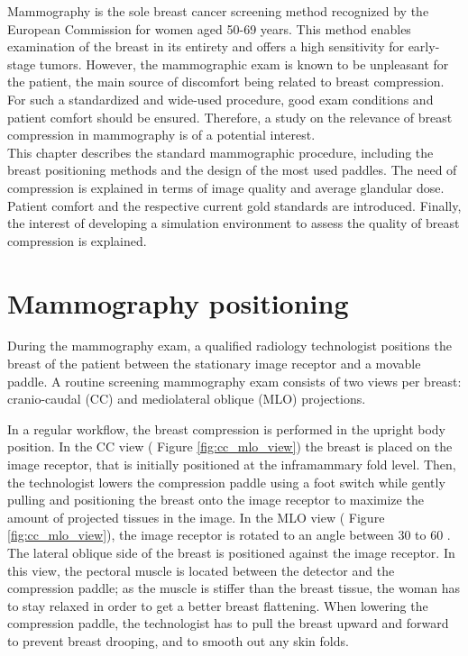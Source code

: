 

Mammography is the sole breast cancer screening method recognized by the European Commission for women aged 50-69 years. This method enables examination of the breast in its entirety and offers a high sensitivity for early-stage tumors. However, the mammographic exam is known to be unpleasant for the patient, the main source of discomfort being related to breast compression.  For such a standardized and wide-used procedure, good exam conditions and patient comfort should be ensured. Therefore, a study on the relevance of breast compression in mammography is of a potential interest.\\



 This chapter describes the standard mammographic procedure, including the breast positioning methods and the design of the most used paddles. The need of compression is explained in terms of image quality and average glandular dose. Patient comfort and the respective current gold standards are introduced. Finally, the interest of developing a simulation environment to assess the quality of breast compression is explained.

\clearpage
\section{Mammography positioning} \label{subsec:mammographicpositioning}

During the mammography exam, a qualified radiology technologist positions the breast of the patient between the stationary image receptor and a movable paddle. A routine screening mammography exam consists of two views per breast: cranio-caudal (CC) and mediolateral oblique (MLO) projections.  

In a regular workflow, the breast compression is performed in the upright body position. In the CC view ( Figure \ref{fig:cc_mlo_view}) the breast is placed on the image receptor, that is initially positioned at the inframammary fold level. Then, the technologist lowers the compression paddle using a foot switch while gently pulling and positioning the breast onto the image receptor to maximize the amount of projected tissues in the image. In the MLO view ( Figure  \ref{fig:cc_mlo_view}), the image receptor is rotated to an angle between 30 \textdegree to 60 \textdegree. The lateral oblique side of the breast is positioned against the image receptor. In this view, the pectoral muscle is located between the detector and the compression paddle; as the muscle is stiffer than the breast tissue, the woman has to stay relaxed in order to get a better breast flattening. When lowering the compression paddle, the technologist has to pull the breast upward and forward to prevent breast drooping, and to smooth out any skin folds. 


